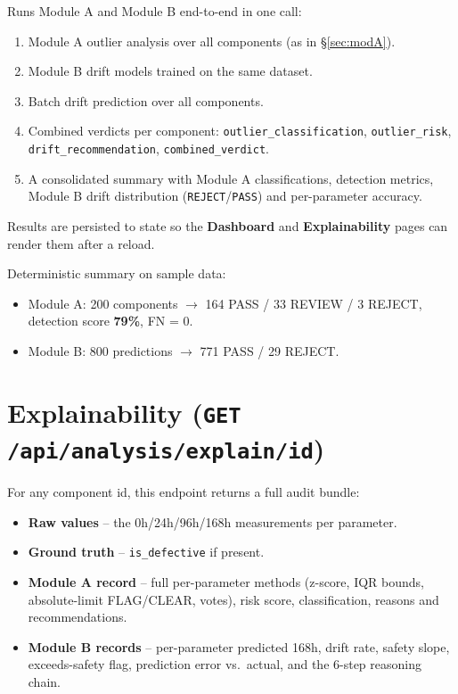 \documentclass[11pt,a4paper]{article}
\newcommand{\code}[1]{\texttt{\small #1}}
\begin{document}
Runs Module A and Module B end-to-end in one call:
\begin{enumerate}[leftmargin=1.5em]
  \item Module A outlier analysis over all components (as in \S\ref{sec:modA}).
  \item Module B drift models trained on the same dataset.
  \item Batch drift prediction over all components.
  \item Combined verdicts per component: \code{outlier\_classification},
        \code{outlier\_risk}, \code{drift\_recommendation}, \code{combined\_verdict}.
  \item A consolidated summary with Module A classifications, detection metrics, Module B
        drift distribution (\code{REJECT}/\code{PASS}) and per-parameter accuracy.
\end{enumerate}

Results are persisted to state so the \textbf{Dashboard} and \textbf{Explainability} pages can
render them after a reload.

Deterministic summary on sample data:
\begin{itemize}[leftmargin=1.5em]
  \item Module A: 200 components $\rightarrow$ 164 PASS / 33 REVIEW / 3 REJECT,
        detection score \textbf{79\%}, FN = 0.
  \item Module B: 800 predictions $\rightarrow$ 771 PASS / 29 REJECT.
\end{itemize}

\section{Explainability (\code{GET /api/analysis/explain/{id}})}
\label{sec:explain}

For any component id, this endpoint returns a full audit bundle:
\begin{itemize}[leftmargin=1.5em]
  \item \textbf{Raw values} -- the 0h/24h/96h/168h measurements per parameter.
  \item \textbf{Ground truth} -- \code{is\_defective} if present.
  \item \textbf{Module A record} -- full per-parameter methods (z-score, IQR bounds,
        absolute-limit FLAG/CLEAR, votes), risk score, classification, reasons and
        recommendations.
  \item \textbf{Module B records} -- per-parameter predicted 168h, drift rate, safety slope,
        exceeds-safety flag, prediction error vs.\ actual, and the 6-step reasoning chain.
\end{itemize}
\end{document}
